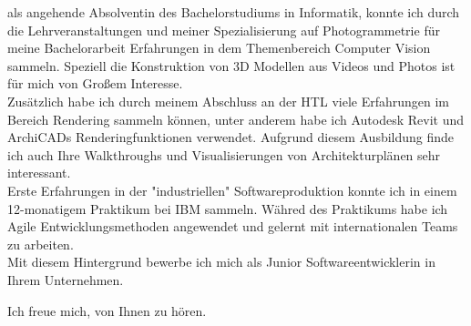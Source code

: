 \documentclass[11pt,stdletter,sigleft,dateno]{newlfm}
\begin{document}
\begin{newlfm}
als angehende Absolventin des Bachelorstudiums in Informatik, konnte ich durch die Lehrveranstaltungen und meiner Spezialisierung auf Photogrammetrie für meine Bachelorarbeit Erfahrungen in dem Themenbereich Computer Vision sammeln. Speziell die Konstruktion von 3D Modellen aus Videos und Photos ist für mich von Großem Interesse.\\
Zusätzlich habe ich durch meinem Abschluss an der HTL viele Erfahrungen im Bereich Rendering sammeln können, unter anderem habe ich Autodesk Revit und ArchiCADs Renderingfunktionen verwendet. Aufgrund diesem Ausbildung finde ich auch Ihre Walkthroughs und Visualisierungen von Architekturplänen sehr interessant.\\
Erste Erfahrungen in der "industriellen" Softwareproduktion konnte ich in einem 12-monatigem Praktikum bei IBM sammeln. Währed des Praktikums habe ich Agile Entwicklungsmethoden angewendet und gelernt mit internationalen Teams zu arbeiten.\\

Mit diesem Hintergrund bewerbe ich mich als Junior Softwareentwicklerin in Ihrem Unternehmen. 

Ich freue mich, von Ihnen zu hören.\\
\end{newlfm}
\end{document}
